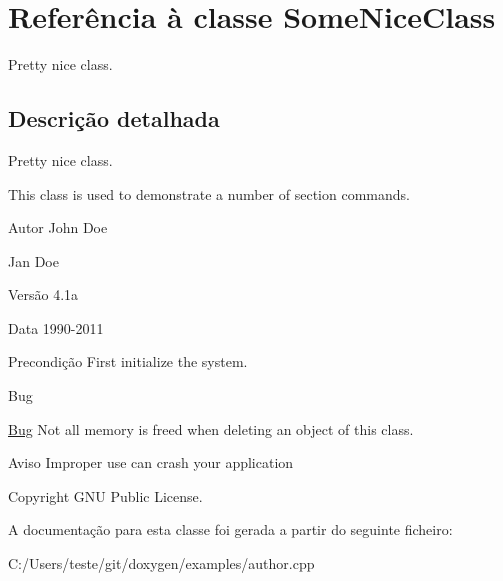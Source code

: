 \hypertarget{class_some_nice_class}{\section{Referência à classe Some\-Nice\-Class}
\label{class_some_nice_class}
}


Pretty nice class.  




\subsection{Descrição detalhada}
Pretty nice class. 

This class is used to demonstrate a number of section commands. \begin{DoxyAuthor}{Autor}
John Doe 

Jan Doe 
\end{DoxyAuthor}
\begin{DoxyVersion}{Versão}
4.\-1a 
\end{DoxyVersion}
\begin{DoxyDate}{Data}
1990-\/2011 
\end{DoxyDate}
\begin{DoxyPrecond}{Precondição}
First initialize the system. 
\end{DoxyPrecond}
\begin{DoxyRefDesc}{Bug}
\item[\hyperlink{bug__bug000001}{Bug}]Not all memory is freed when deleting an object of this class. \end{DoxyRefDesc}
\begin{DoxyWarning}{Aviso}
Improper use can crash your application 
\end{DoxyWarning}
\begin{DoxyCopyright}{Copyright}
G\-N\-U Public License. 
\end{DoxyCopyright}


A documentação para esta classe foi gerada a partir do seguinte ficheiro\-:\begin{DoxyCompactItemize}
\item 
C\-:/\-Users/teste/git/doxygen/examples/author.\-cpp\end{DoxyCompactItemize}
